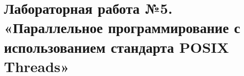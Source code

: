 \section{Лабораторная работа №5. «Параллельное программирование с использованием стандарта POSIX Threads»}




